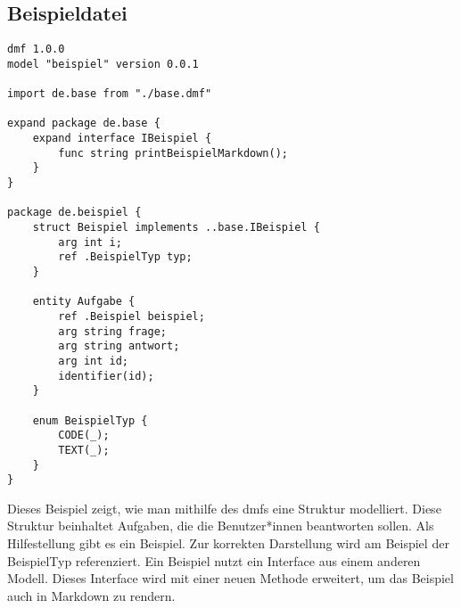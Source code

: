 \documentclass[./einleitung.tex]{subfiles}
\begin{document}
\subsection{Beispieldatei}\label{subsec:beispieldatei}
\begin{lstlisting}[language=DMF, caption=Inhalt der Beispieldatei]
dmf 1.0.0
model "beispiel" version 0.0.1

import de.base from "./base.dmf"

expand package de.base {
    expand interface IBeispiel {
        func string printBeispielMarkdown();
    }
}

package de.beispiel {
    struct Beispiel implements ..base.IBeispiel {
        arg int i;
        ref .BeispielTyp typ;
    }
    
    entity Aufgabe {
        ref .Beispiel beispiel;
        arg string frage;
        arg string antwort;
        arg int id;
        identifier(id);
    }
    
    enum BeispielTyp {
        CODE(_);
        TEXT(_);
    }
}
\end{lstlisting}
Dieses Beispiel zeigt, wie man mithilfe des \acrshort{dmf}s eine Struktur modelliert.
Diese Struktur beinhaltet Aufgaben, die die Benutzer*innen beantworten sollen.
Als Hilfestellung gibt es ein Beispiel.
Zur korrekten Darstellung wird am Beispiel der BeispielTyp referenziert.
Ein Beispiel nutzt ein Interface aus einem anderen Modell.
Dieses Interface wird mit einer neuen Methode erweitert, um das Beispiel auch in Markdown zu rendern.

\end{document}
